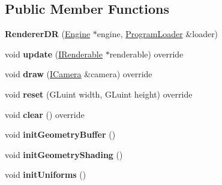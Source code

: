 \subsection*{Public Member Functions}
\begin{DoxyCompactItemize}
\item 
\mbox{\label{classflw_1_1flf_1_1RendererDR_aebaffd8158ea906753c476b228153572}} 
{\bfseries Renderer\+DR} (\hyperlink{classflw_1_1Engine}{Engine} $\ast$engine, \hyperlink{classflw_1_1flf_1_1ProgramLoader}{Program\+Loader} \&loader)
\item 
\mbox{\label{classflw_1_1flf_1_1RendererDR_af24a94504ff0bbec00843bf6027f3fbb}} 
void {\bfseries update} (\hyperlink{classflw_1_1flf_1_1IRenderable}{I\+Renderable} $\ast$renderable) override
\item 
\mbox{\label{classflw_1_1flf_1_1RendererDR_a90ce736663478130acc605e4f6378769}} 
void {\bfseries draw} (\hyperlink{classflw_1_1flf_1_1ICamera}{I\+Camera} \&camera) override
\item 
\mbox{\label{classflw_1_1flf_1_1RendererDR_af915da21688fac75e2957ea57c8442bc}} 
void {\bfseries reset} (G\+Luint width, G\+Luint height) override
\item 
\mbox{\label{classflw_1_1flf_1_1RendererDR_a06b7d4179472c7040484693cabfeeb8d}} 
void {\bfseries clear} () override
\item 
\mbox{\label{classflw_1_1flf_1_1RendererDR_a677affaaf7a64b8a68c593f520f43497}} 
void {\bfseries init\+Geometry\+Buffer} ()
\item 
\mbox{\label{classflw_1_1flf_1_1RendererDR_a893839e02336a751c8d5ff0451e526cc}} 
void {\bfseries init\+Geometry\+Shading} ()
\item 
\mbox{\label{classflw_1_1flf_1_1RendererDR_a459281e950903ca0b4d31d250684ce51}} 
void {\bfseries init\+Uniforms} ()
\item 
\mbox{\label{classflw_1_1flf_1_1RendererDR_a4a06e01841f3b48d138f5bd0904fa150}} 

\end{DoxyCompactItemize}
